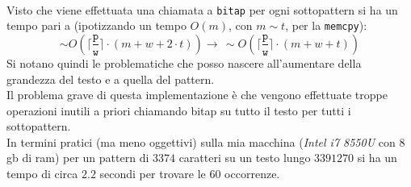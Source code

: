 \documentclass[a4paper,12pt, oneside]{article}
\begin{document}
\\
Visto che viene effettuata una chiamata a \texttt{bitap} per ogni
sottopattern si ha un tempo pari a (ipotizzando un tempo $O(m)$, con
$m\sim t$, per la \texttt{memcpy}):
\[\sim O\left(\Big\lceil
  \frac{\mathtt{p}}{\mathtt{w}}\Big\rceil\cdot (m + w + 2\cdot
  t)\right)\to\,\sim 
O\left(\Big\lceil \frac{\mathtt{p}}{\mathtt{w}}\Big\rceil\cdot (m + w
  + t)\right)\] 
Si notano quindi le problematiche che posso nascere all'aumentare
della grandezza del testo e a quella del pattern.\\
Il problema grave di questa implementazione è che vengono effettuate
troppe operazioni inutili a priori chiamando bitap su tutto il testo
per tutti i sottopattern.\\
In termini pratici (ma meno oggettivi) sulla mia macchina
(\textit{Intel i7 8550U} con $8$gb di ram) per un pattern di $3374$
caratteri su un testo lungo $3391270$ si ha un tempo di circa $2.2$
secondi per trovare le $60$ occorrenze.
\newpage
\end{document}
